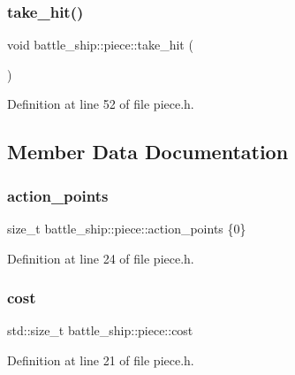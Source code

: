 \subsubsection{\texorpdfstring{take\+\_\+hit()}{take\_hit()}}
{\footnotesize\ttfamily void battle\+\_\+ship\+::piece\+::take\+\_\+hit (\begin{DoxyParamCaption}{ }\end{DoxyParamCaption})\hspace{0.3cm}{\ttfamily [inline]}}



Definition at line 52 of file piece.\+h.



\subsection{Member Data Documentation}
\mbox{\label{classbattle__ship_1_1piece_a51ee1880181f13dd0cc0a151419c4d9a}} 
\subsubsection{\texorpdfstring{action\+\_\+points}{action\_points}}
{\footnotesize\ttfamily size\+\_\+t battle\+\_\+ship\+::piece\+::action\+\_\+points \{0\}\hspace{0.3cm}{\ttfamily [protected]}}



Definition at line 24 of file piece.\+h.

\mbox{\label{classbattle__ship_1_1piece_a6ee6ca91acdbacffb339001e9857e0cc}} 
\subsubsection{\texorpdfstring{cost}{cost}}
{\footnotesize\ttfamily std\+::size\+\_\+t battle\+\_\+ship\+::piece\+::cost\hspace{0.3cm}{\ttfamily [protected]}}



Definition at line 21 of file piece.\+h.

